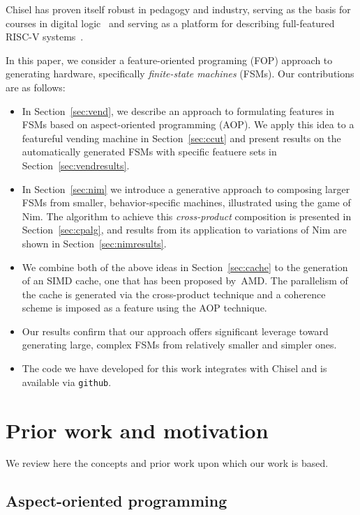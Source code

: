 \documentclass[sigplan,anonymous,review]{acmart}
\begin{document}
Chisel has proven itself robust in pedagogy and industry, serving as the basis for courses in digital logic~\cite{vlsicourse} and serving as a platform for describing full-featured RISC-V systems~\cite{chisel:riscv}.  

In this paper, we consider a feature-oriented programing (FOP) approach to generating hardware, specifically \emph{finite-state machines} (FSMs).   Our contributions are as follows:
\begin{itemize}
    \item In Section~\ref{sec:vend}, we describe an approach to formulating features in FSMs based on aspect-oriented programming (AOP).  We apply this idea to a featureful vending machine in Section~\ref{sec:ccut} and present results on the automatically generated FSMs with specific featuere sets in Section~\ref{sec:vendresults}.
    \item In Section~\ref{sec:nim} we introduce a generative approach to composing larger FSMs from smaller, behavior-specific machines, illustrated using the game of Nim.  The algorithm to achieve this \emph{cross-product} composition is presented in Section~\ref{sec:cpalg}, and results from its application to variations of Nim are shown in Section~\ref{sec:nimresults}.
    \item We combine both of the above ideas in Section~\ref{sec:cache} to the generation of an SIMD cache, one that has been proposed by~AMD.  The parallelism of the cache is generated via the cross-product technique and a coherence scheme is imposed as a feature using the AOP technique.
    \item Our results confirm that our approach offers significant leverage toward generating large, complex FSMs from relatively smaller and simpler ones.
    \item The code we have developed for this work integrates with Chisel and is available via \texttt{github}\cite{anon}.
\end{itemize}


\section{Prior work and motivation}\label{sec:prior}

We review here the concepts and prior work upon which our work is based.
\subsection{Aspect-oriented programming}
\end{document}
